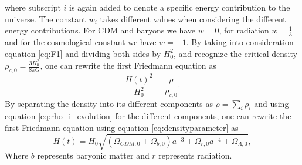 where subscript $i$ is again added to denote a specific energy contribution to
the universe. The constant $w_i$ takes different values when considering the
different energy contributions. For CDM and baryons we have $w=0$, for
radiation $w=\frac{1}{3}$ and for the cosmological constant we have $w=-1$. By
taking into consideration equation \ref{eq:F1} and dividing both sides by $H_0^2$,
and recognize the critical density $\rho_{c,0}=\frac{3H_0^2}{8\pi G}$, one can
rewrite the first Friedmann equation as
\begin{equation}
    \frac{H(t)^2}{H_0^2}=\frac{\rho}{\rho_{c,0}}.
\end{equation}
By separating the density into its different components as $\rho=\sum_i\rho_i$
and using equation \ref{eq:rho_i_evolution} for the different components, one can rewrite
the first Friedmann equation using equation \ref{eq:densityparameter} as
\begin{equation}
    H(t)=H_0\sqrt{(\Omega_{CDM,0} + \Omega_{b,0})a^{-3} + \Omega_{r,0}a^{-4} + \Omega_{\Lambda,0}},
\end{equation}
Where $b$ represents baryonic matter and $r$ represents radiation.

